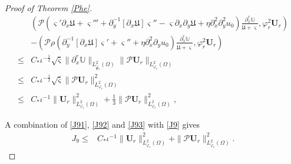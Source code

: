 \documentclass{amsart}
\numberwithin{equation}{section}
\begin{document}
\begin{proof}[Proof of Theorem \ref{Phe}]
\begin{align}
&\left(\mathcal{P}\left(\varsigma'\partial_{x}\mathfrak{U}+\varsigma'''+\partial_{y}^{-1}[\partial_{x}\mathfrak{U}]\varsigma''-\varsigma\partial_{x}\partial_{y}\mathfrak{U}+\eta\partial_{x}^{2}\partial_{y}^{2}u_{0}\right)\frac{\partial_{x}^{r}\mathbb{U}}{\dot{\mathfrak{U}}+\varsigma},\varphi_{r}^{2}\mathbf{U}_{r}\right)\\
&-\left(\mathcal{P}\rho\left(\partial_{y}^{-1}[\partial_{x}\mathfrak{U}]\varsigma'+\varsigma''+\eta\partial_{x}^{2}\partial_{y}u_{0}\right)\frac{\partial_{x}^{r}\mathbb{U}}{\dot{\mathfrak{U}}+\varsigma},\varphi_{r}^{2}\mathbf{U}_{r}\right)\nonumber\\
\leq& C_{*}\iota^{-\frac{1}{2}}\sqrt{\bar{\varsigma}}\|\partial_{x}^{r}\mathbb{U}\|_{L_{\hat{\Psi}_{r}}^{2}(\Omega)}
                               \|\mathcal{P}\mathbf{U}_{r}\|_{L_{\varphi_{r}}^{2}(\Omega)}\nonumber\\
\leq& C_{*}\iota^{-\frac{1}{2}}\sqrt{\bar{\varsigma}}\|\mathcal{P}\mathbf{U}_{r}\|_{L_{\varphi_{r}}^{2}(\Omega)}^{2}\nonumber\\
\leq& C_{*}\iota^{-1}\|\mathbf{U}_{r}\|_{L_{\varphi_{r}}^{2}(\Omega)}^{2}
     +\frac{1}{3}\|\mathcal{P}\mathbf{U}_{r}\|_{L_{\varphi_{r}}^{2}(\Omega)}^{2},\nonumber
\end{align}

A combination of \eqref{J91}, \eqref{J92} and \eqref{J93} with \eqref{J9} gives
\begin{align*}
J_{9}
\leq& C_{*}\iota^{-1}\|\mathbf{U}_{r}\|_{L_{\varphi_{r}}^{2}(\Omega)}^{2}
     +\|\mathcal{P}\mathbf{U}_{r}\|_{L_{\varphi_{r}}^{2}(\Omega)}^{2}.
\end{align*}


\end{proof}
\end{document}
